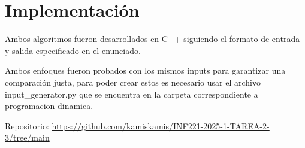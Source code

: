 \section{Implementación}

Ambos algoritmos fueron desarrollados en C++ siguiendo el formato de entrada y salida especificado en el enunciado. 

Ambos enfoques fueron probados con los mismos inputs para garantizar una comparación justa, para poder crear estos es necesario
usar el archivo input_generator.py que se encuentra en la carpeta correspondiente a programacion dinamica.

Repositorio: \url{https://github.com/kamiskamis/INF221-2025-1-TAREA-2-3/tree/main}

